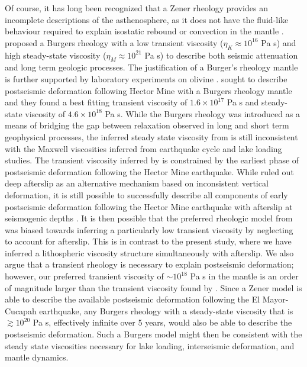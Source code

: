 \documentclass[1p]{elsarticle}
\begin{document}
Of course, it has long been recognized that a Zener rheology provides an incomplete descriptions of the asthenosphere, as it does not have the fluid-like behaviour required to explain isostatic rebound or convection in the mantle \citep{OConnell1971}.  \citet{Yuen1982} proposed a Burgers rheology with a low transient viscosity ($\eta_K\approx10^{16}$ Pa s) and high steady-state viscosity ($\eta_M\approx10^{21}$ Pa s) to describe both seismic attenuation and long term geologic processes.  The justification of a Burger's rheology mantle is further supported by laboratory experiments on olivine \citep{Chopra1997}.  \citet{Pollitz2003} sought to describe postseismic deformation following Hector Mine with a Burgers rheology mantle and they found a best fitting transient viscosity of $1.6\times10^{17}$ Pa s and steady-state viscosity of $4.6\times10^{18}$ Pa s. While the Burgers rheology was introduced as a means of bridging the gap between relaxation observed in long and short term geophysical processes, the inferred steady state viscosity from \citet{Pollitz2003} is still inconsistent with the Maxwell viscosities inferred from earthquake cycle and lake loading studies.  The transient viscosity inferred by \citet{Pollitz2003} is constrained by the earliest phase of postseismic deformation following the Hector Mine earthquake. While \citet{Pollitz2003} ruled out deep afterslip as an alternative mechanism based on inconsistent vertical deformation, it is still possible to successfully describe all components of early postseismic deformation following the Hector Mine earthquake with afterslip at seismogenic depths \citep{Jacobs2002}. It is then possible that the preferred rheologic model from \citet{Pollitz2003} was biased towards inferring a particularly low transient viscosity by neglecting to account for afterslip.  This is in contrast to the present study, where we have inferred a lithospheric viscosity structure simultaneously with afterslip.  We also argue that a transient rheology is necessary to explain postseismic deformation; however, our preferred transient viscosity of $\sim10^{18}$ Pa s in the mantle is an order of magnitude larger than the transient viscosity found by \citet{Pollitz2003}.  Since a Zener model is able to describe the available postseismic deformation following the El Mayor-Cucapah earthquake, any Burgers rheology with a steady-state viscosity that is $\gtrsim10^{20}$ Pa s, effectively infinite over 5 years, would also be able to describe the postseismic deformation. Such a Burgers model might then be consistent with the steady state viscosities necessary for lake loading, interseismic deformation, and mantle dynamics.
\end{document}
